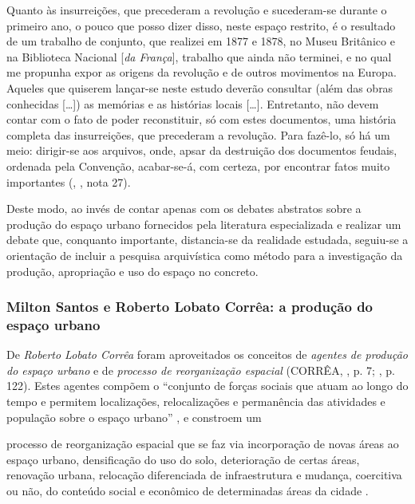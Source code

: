 \begin{citacao}
Quanto às insurreições, que precederam a revolução e sucederam-se durante o primeiro ano, o pouco que posso dizer disso, neste espaço restrito, é o resultado de um trabalho de conjunto, que realizei em 1877 e 1878, no Museu Britânico e na Biblioteca Nacional [\textit{da França}], trabalho que ainda não terminei, e no qual me propunha expor as origens da revolução e de outros movimentos na Europa. Aqueles que quiserem lançar-se neste estudo deverão consultar (além das obras conhecidas [{\dots}]) as memórias e as histórias locais [{\dots}]. Entretanto, não devem contar com o fato de poder reconstituir, só com estes documentos, uma história completa das insurreições, que precederam a revolução. Para fazê-lo, só há um meio: dirigir-se aos arquivos, onde, apsar da destruição dos documentos feudais, ordenada pela Convenção, acabar-se-á, com certeza, por encontrar fatos muito importantes (\citeauthor{KROPOTKIN2005f}, \citeyear{KROPOTKIN2005f},  nota 27).
\end{citacao}

Deste modo, ao invés de contar apenas com os debates abstratos sobre a produção do espaço urbano fornecidos pela literatura especializada e realizar um debate que, conquanto importante, distancia-se da realidade estudada, seguiu-se a orientação de incluir a pesquisa arquivística como método para a investigação da produção, apropriação e uso do espaço no concreto.

\subsubsection{Milton Santos e Roberto Lobato Corrêa: a produção do espaço urbano}\label{subsubsec:milsanroblobcor}

De \textit{Roberto Lobato Corrêa} foram aproveitados os conceitos de \textit{agentes de produção do espaço urbano} e de \textit{processo de reorganização espacial} (CORRÊA, \citeyear{CORREA1985espa}, p. 7; \citeyear{CORREA1997}, p. 122). Estes agentes compõem o ``conjunto de forças sociais que atuam ao longo do tempo e permitem localizações, relocalizações e permanência das atividades e população sobre o espaço urbano'' \cite[p.~122]{CORREA1997}, e constroem um

\begin{citacao}
processo de reorganização espacial que se faz via incorporação de novas áreas ao espaço urbano, densificação do uso do solo, deterioração de certas áreas, renovação urbana, relocação diferenciada de infraestrutura e mudança, coercitiva ou não, do conteúdo social e econômico de determinadas áreas da cidade \cite[p.~7]{CORREA1985espa}.
\end{citacao}

